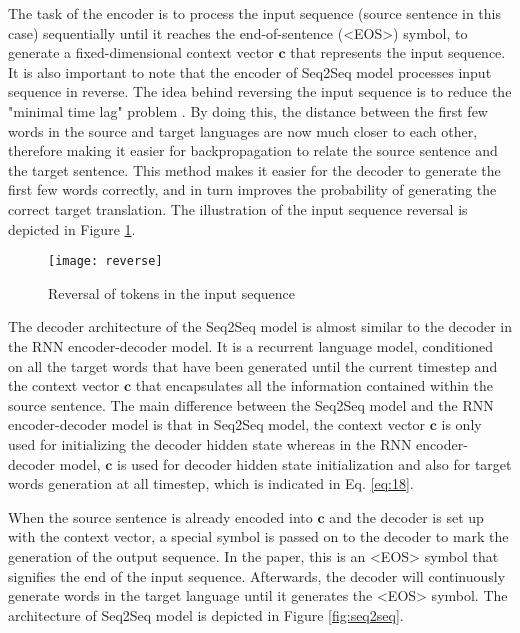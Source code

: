 \documentclass[12pt]{extarticle}
\begin{document}
The task of the encoder is to process the input sequence (source sentence in this case) sequentially until it reaches the end-of-sentence (\textless EOS\textgreater{}) symbol, to generate a fixed-dimensional context vector $\textbf{c}$ that represents the input sequence. It is also important to note that the encoder of Seq2Seq model processes input sequence in reverse. The idea behind reversing the input sequence is to reduce the "minimal time lag" problem \citep{Hochreiter:1996:LSH:2998981.2999048}. By doing this, the distance between the first few words in the source and target languages are now much closer to each other, therefore making it easier for backpropagation to relate the source sentence and the target sentence. This method makes it easier for the decoder to generate the first few words correctly, and in turn improves the probability of generating the correct target translation. The illustration of the input sequence reversal is depicted in Figure \ref{fig:reverse}.

\begin{figure}[ht]
\centering
\texttt{[image: reverse]}
\caption{Reversal of tokens in the input sequence}
\label{fig:reverse}
\end{figure}

The decoder architecture of the Seq2Seq model is almost similar to the decoder in the RNN encoder-decoder model. It is a recurrent language model, conditioned on all the target words that have been generated until the current timestep and the context vector $\textbf{c}$ that encapsulates all the information contained within the source sentence. The main difference between the Seq2Seq model and the RNN encoder-decoder model is that in Seq2Seq model, the context vector $\textbf{c}$ is only used for initializing the decoder hidden state whereas in the RNN encoder-decoder model, $\textbf{c}$ is used for decoder hidden state initialization and also for target words generation at all timestep, which is indicated in Eq. \ref{eq:18}. 

When the source sentence is already encoded into $\textbf{c}$ and the decoder is set up with the context vector, a special symbol is passed on to the decoder to mark the generation of the output sequence. In the paper, this is an \textless EOS\textgreater{} symbol that signifies the end of the input sequence. Afterwards, the decoder will continuously generate words in the target language until it generates the \textless EOS\textgreater{} symbol. The architecture of Seq2Seq model is depicted in Figure \ref{fig:seq2seq}.
\end{document}
